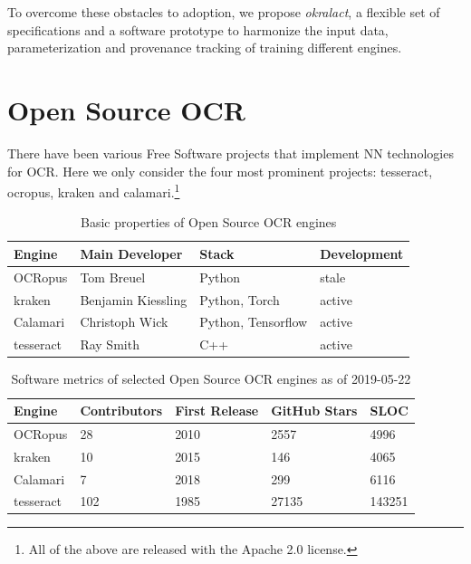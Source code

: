 \documentclass[conference]{IEEEtran}
\begin{document}
To overcome these obstacles to adoption, we propose
\textit{okralact}, a flexible set of specifications and a software
prototype to harmonize the input data, parameterization and
provenance tracking of training different engines.

\section*{Open Source OCR}

There have been various Free Software projects that implement NN technologies
for OCR. Here we only consider the four most prominent projects: tesseract, ocropus,
kraken and calamari.\footnote{All of the above are released with the Apache 2.0 license.}

\begin{table}[b]
\begin{tabular}{llll}
\hline
Engine    & Main Developer     & Stack                      & Development \\ \hline
OCRopus   & Tom Breuel         & Python                     & stale       \\
kraken    & Benjamin Kiessling & Python, Torch              & active      \\
Calamari  & Christoph Wick     & Python, Tensorflow         & active      \\
tesseract & Ray Smith          & C++                        & active
\end{tabular}
\caption{Basic properties of Open Source OCR engines}
\label{tab:basic}
\end{table}

\begin{table}[b]
\begin{tabular}{lllll}
\hline
Engine    & Contributors & First Release & GitHub Stars & SLOC \\ \hline
OCRopus   & 28           & 2010          & 2557         & 4996 \\
kraken    & 10           & 2015          & 146          & 4065 \\
Calamari  & 7            & 2018          & 299          & 6116 \\
tesseract & 102          & 1985          & 27135        & 143251 \\

\end{tabular}
\caption{Software metrics of selected Open Source OCR engines as of 2019-05-22}
\label{tab:stats}
\end{table}
\end{document}
